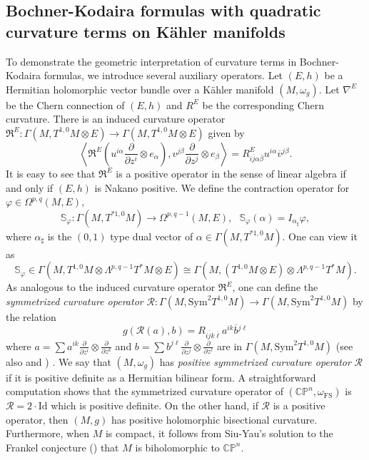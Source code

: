 \documentclass[12pt, reqno]{amsart}
\theoremstyle{plain}
\theoremstyle{definition}
\newcommand{\p}{\partial}
\renewcommand{\bar}{\overline}
\renewcommand{\phi}{\varphi}
\newcommand{\beq}{\begin{equation}}
\newcommand{\eeq}{\end{equation}}
\renewcommand{\>}{\rightarrow}
\newcommand{\C}{{\mathbb C}}
\renewcommand{\P}{{\mathbb P}}
\renewcommand{\#}{\sharp}
\numberwithin{equation}{section} %
\begin{document}
    \subsection{Bochner-Kodaira formulas with quadratic curvature terms on K\"ahler manifolds}
 To demonstrate the geometric interpretation of  curvature terms in  Bochner-Kodaira formulas, we introduce several auxiliary operators.    Let $(E,h)$ be a Hermitian holomorphic vector bundle over a K\"ahler manifold $(M,\omega_g)$.   Let $\nabla^E$ be the Chern connection of $(E,h)$ and $R^E$ be the corresponding Chern curvature. There is an induced curvature operator $\mathfrak{R}^E: \Gamma(M,T^{1,0}M \otimes E) \> \Gamma(M,T^{1,0}M \otimes E) $ given by
    \beq \left\langle \mathfrak{R}^E\left(u^{i\alpha} \frac{\p}{\p z^i} \otimes e_\alpha \right), v^{j\beta}\frac{\p}{\p z^j} \otimes e_\beta \right\rangle = R^E_{i\bar j\alpha\bar\beta}u^{i\alpha} \bar v{}^{j\beta}. \eeq
It is easy to see that $ \mathfrak{R}^E $ is a positive operator in the sense of linear algebra if and only if $ (E,h) $ is Nakano positive.  We define the contraction operator  for $ \phi \in \Omega^{p,q}(M,E) $,
    \beq \mathbb{S}_\phi: \Gamma(M,T^{*1,0}M) \> \Omega^{p,q-1}(M,E), \ \ \ \mathbb{S}_\phi(\alpha) = I_{\alpha_\#} \phi, \eeq
where $ \alpha_\# $ is the  $(0,1)$ type dual vector of  $ \alpha \in \Gamma(M,T^{*1,0}M) $.  One can view it as
    \beq \mathbb{S}_\phi \in \Gamma(M,T^{1,0}M \otimes \Lambda^{p,q-1}T^*M\otimes E )\cong\Gamma\left(M,\left(T^{1,0}M \otimes E\right) \otimes \Lambda^{p,q-1}T^*M\right).\eeq
    As analogous to the induced curvature operator $\mathfrak R^E$,
    one can define the \emph{symmetrized curvature operator}  $ \mathcal {R}: \Gamma(M,\mathrm{Sym}^2 T^{1,0}M) \> \Gamma(M,\mathrm{Sym}^2 T^{1,0}M )$ by the relation \beq  g\left( \mathcal{R} \left(a\right),  b\right) = R_{i\bar j k \bar\ell} a^{ik}\bar b{}^{j\ell} \eeq where  $a=\sum a^{ik}\frac{\p}{\p z^i} \otimes \frac{\p}{\p z^k}$ and $b=\sum b^{j\ell}\frac{\p}{\p z^j} \otimes \frac{\p}{\p z^\ell}$ are in  $\Gamma(M,\mathrm{Sym}^2 T^{1,0}M)$ (see also \cite{CV60} and \cite{BNPSW25}) .  We say that  $(M,\omega_g)$ has \emph{positive symmetrized curvature operator} $\mathcal R$
if it is positive definite as a Hermitian bilinear form.
A straightforward computation shows that the symmetrized curvature operator of $(\C\P^n, \omega_{\mathrm{FS}})$ is $\mathcal R=2\cdot \mathrm{Id}$ which is  positive definite. On the other hand,
    if  $\mathcal {R}$ is a positive operator, then $(M,g)$ has positive holomorphic bisectional curvature. Furthermore,  when $M$ is compact,  it follows from Siu-Yau's solution to the Frankel conjecture (\cite{SiuYau1980,Mori1979}) that  $M$ is biholomorphic to $\C\P^n$.\\
\end{document}
